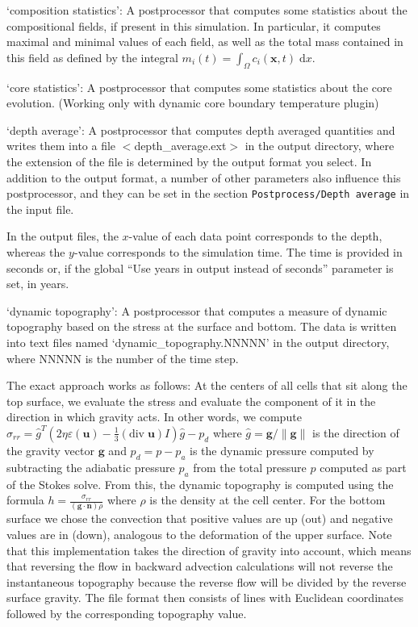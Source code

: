 \begin{itemize}
`composition statistics': A postprocessor that computes some statistics about the compositional fields, if present in this simulation. In particular, it computes maximal and minimal values of each field, as well as the total mass contained in this field as defined by the integral $m_i(t) = \int_\Omega c_i(\mathbf x,t) \; \text{d}x$.

`core statistics': A postprocessor that computes some statistics about the core evolution. (Working only with dynamic core boundary temperature plugin)

`depth average': A postprocessor that computes depth averaged quantities and writes them into a file $<$depth\_average.ext$>$ in the output directory, where the extension of the file is determined by the output format you select. In addition to the output format, a number of other parameters also influence this postprocessor, and they can be set in the section \texttt{Postprocess/Depth average} in the input file.

In the output files, the $x$-value of each data point corresponds to the depth, whereas the $y$-value corresponds to the simulation time. The time is provided in seconds or, if the global ``Use years in output instead of seconds'' parameter is set, in years.

`dynamic topography': A postprocessor that computes a measure of dynamic topography based on the stress at the surface and bottom. The data is written into text files named `dynamic\_topography.NNNNN' in the output directory, where NNNNN is the number of the time step.

The exact approach works as follows: At the centers of all cells that sit along the top surface, we evaluate the stress and evaluate the component of it in the direction in which gravity acts. In other words, we compute $\sigma_{rr}={\hat g}^T(2 \eta \varepsilon(\mathbf u)- \frac 13 (\textrm{div}\;\mathbf u)I)\hat g - p_d$ where $\hat g = \mathbf g/\|\mathbf g\|$ is the direction of the gravity vector $\mathbf g$ and $p_d=p-p_a$ is the dynamic pressure computed by subtracting the adiabatic pressure $p_a$ from the total pressure $p$ computed as part of the Stokes solve. From this, the dynamic topography is computed using the formula $h=\frac{\sigma_{rr}}{(\mathbf g \cdot \mathbf n)  \rho}$ where $\rho$ is the density at the cell center. For the bottom surface we chose the convection that positive values are up (out) and negative values are in (down), analogous to the deformation of the upper surface. Note that this implementation takes the direction of gravity into account, which means that reversing the flow in backward advection calculations will not reverse the instantaneous topography because the reverse flow will be divided by the reverse surface gravity.  
The file format then consists of lines with Euclidean coordinates followed by the corresponding topography value.


\end{itemize}

